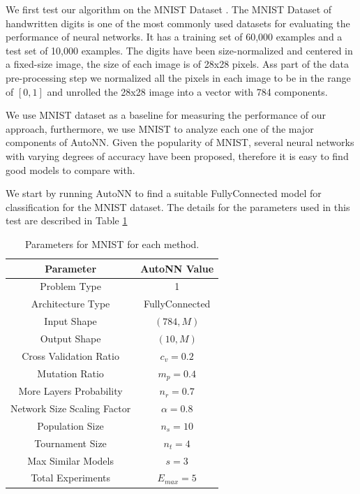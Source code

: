 \documentclass[journal]{IEEEtran}
\begin{document}
We first test our algorithm on the MNIST Dataset \cite{Lecun2010}. The MNIST Dataset of handwritten digits is one of the most commonly used datasets for evaluating the performance of neural networks. It has a training set of 60,000 examples and a test set of 10,000 examples. The digits have been size-normalized and centered in a fixed-size image, the size of each image is of 28x28 pixels. Ass part of the data pre-processing step we normalized all the pixels in each image to be in the range of $[0,1]$ and unrolled the 28x28 image into a vector with 784 components.

We use MNIST dataset as a baseline for measuring the performance of our approach, furthermore, we use MNIST to analyze each one of the major components of AutoNN. Given the popularity of MNIST, several neural networks with varying degrees of accuracy have been proposed, therefore it is easy to find good models to compare with. 

We start by running AutoNN to find a suitable FullyConnected model for classification for the MNIST dataset. The details for the parameters used in this test are described in Table \ref{table:MNIST_params}

\begin{table}[!htb]
\begin{center}
\begin{tabular}{| c | c |}
\hline
Parameter & AutoNN Value \\
\hline
Problem Type & 1 \\
Architecture Type & FullyConnected \\
Input Shape & $(784, M)$  \\
Output Shape & $(10, M)$ \\
Cross Validation Ratio & $c_v = 0.2$ \\
Mutation Ratio & $m_p = 0.4$ \\
More Layers Probability & $n_r = 0.7$ \\
Network Size Scaling Factor & $\alpha = 0.8$ \\
Population Size & $n_s = 10$ \\
Tournament Size & $n_t = 4$ \\
Max Similar Models & $s = 3$ \\
Total Experiments & $E_{max} = 5$ \\
\hline
\end{tabular}
\end{center}
\caption{Parameters for MNIST for each method.}
\label{table:MNIST_params}
\end{table}
\end{document}
